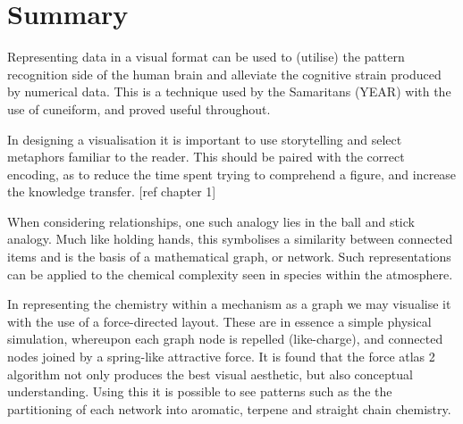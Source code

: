 % 
% 
% 
% 
% 
% 



\section{Summary}
Representing data in a visual format can be used to (utilise) the pattern recognition side of the human brain and alleviate the cognitive strain produced by numerical data. This is a technique used by the Samaritans (YEAR) with the use of cuneiform, and proved useful throughout. 

In designing a visualisation it is important to use storytelling and select metaphors familiar to the reader. This should be paired with the correct encoding, as to reduce the time spent trying to comprehend a figure, and increase the knowledge transfer. [ref chapter 1]

When considering relationships, one such analogy lies in the ball and stick analogy. Much like holding hands, this symbolises a similarity between connected items and is the basis of a mathematical graph, or network. Such representations can be applied to the chemical complexity seen in species within the atmosphere. 

In representing the chemistry within a mechanism as a graph we may visualise it with the use of a force-directed layout. These are in essence a simple physical simulation, whereupon each graph node is repelled (like-charge), and connected nodes joined by a spring-like attractive force. It is found that the force atlas 2 algorithm not only produces the best visual aesthetic, but also conceptual understanding. Using this it is possible to see patterns such as the the partitioning of each network into aromatic, terpene and straight chain chemistry. 

